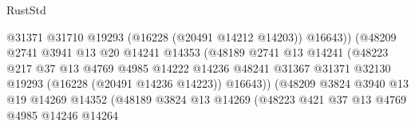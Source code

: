 \begin{lexlean}{RustStd}
\begin{coremodule}
                                            @31371
                                            @31710
                                            @19293
                                            (@16228 (@20491 @14212 @14203))
                                            @16643))
                                        (@48209
                                          @2741
                                          @3941
                                          @13
                                          @20
                                          @14241
                                          @14353
                                          (@48189
                                            @2741
                                            @13
                                            @14241
                                            (@48223
                                              @217
                                              @37
                                              @13
                                              @4769
                                              @4985
                                              @14222
                                              @14236
                                              @48241
                                              @31367
                                              @31371
                                              @32130
                                              @19293
                                              (@16228 (@20491 @14236 @14223))
                                              @16643))
                                          (@48209
                                            @3824
                                            @3940
                                            @13
                                            @19
                                            @14269
                                            @14352
                                            (@48189
                                              @3824
                                              @13
                                              @14269
                                              (@48223
                                                @421
                                                @37
                                                @13
                                                @4769
                                                @4985
                                                @14246
                                                @14264

\end{coremodule}
\end{lexlean}

